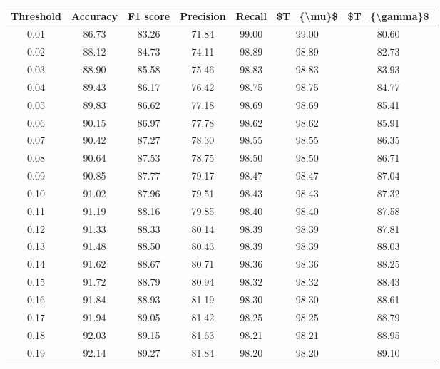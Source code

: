 \begin{tabular}{|c|c|c|c|c|c|c|}
\hline
 Threshold &  Accuracy &  F1 score &  Precision &  Recall &  \$T\_\{\textbackslash mu\}\$ &  \$T\_\{\textbackslash gamma\}\$ \\
\hline
      0.01 &     86.73 &     83.26 &      71.84 &   99.00 &      99.00 &         80.60 \\
      0.02 &     88.12 &     84.73 &      74.11 &   98.89 &      98.89 &         82.73 \\
      0.03 &     88.90 &     85.58 &      75.46 &   98.83 &      98.83 &         83.93 \\
      0.04 &     89.43 &     86.17 &      76.42 &   98.75 &      98.75 &         84.77 \\
      0.05 &     89.83 &     86.62 &      77.18 &   98.69 &      98.69 &         85.41 \\
      0.06 &     90.15 &     86.97 &      77.78 &   98.62 &      98.62 &         85.91 \\
      0.07 &     90.42 &     87.27 &      78.30 &   98.55 &      98.55 &         86.35 \\
      0.08 &     90.64 &     87.53 &      78.75 &   98.50 &      98.50 &         86.71 \\
      0.09 &     90.85 &     87.77 &      79.17 &   98.47 &      98.47 &         87.04 \\
      0.10 &     91.02 &     87.96 &      79.51 &   98.43 &      98.43 &         87.32 \\
      0.11 &     91.19 &     88.16 &      79.85 &   98.40 &      98.40 &         87.58 \\
      0.12 &     91.33 &     88.33 &      80.14 &   98.39 &      98.39 &         87.81 \\
      0.13 &     91.48 &     88.50 &      80.43 &   98.39 &      98.39 &         88.03 \\
      0.14 &     91.62 &     88.67 &      80.71 &   98.36 &      98.36 &         88.25 \\
      0.15 &     91.72 &     88.79 &      80.94 &   98.32 &      98.32 &         88.43 \\
      0.16 &     91.84 &     88.93 &      81.19 &   98.30 &      98.30 &         88.61 \\
      0.17 &     91.94 &     89.05 &      81.42 &   98.25 &      98.25 &         88.79 \\
      0.18 &     92.03 &     89.15 &      81.63 &   98.21 &      98.21 &         88.95 \\
      0.19 &     92.14 &     89.27 &      81.84 &   98.20 &      98.20 &         89.10 \\

\end{tabular}
